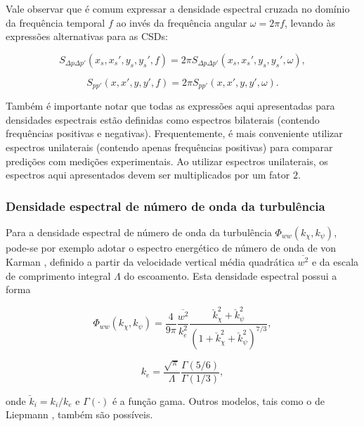 \documentclass[a4paper, 11pt, twoside]{article}
\begin{document}
Vale observar que é comum expressar a densidade espectral cruzada no domínio da frequência temporal $f$ ao invés da frequência angular $\omega = 2 \pi f$, levando às expressões alternativas para as CSDs:

\begin{equation}
	S_{\Delta p \Delta p'} (x_s, x_s', y_s, y_s', f) = 2 \pi S_{\Delta p \Delta p'} (x_s, x_s', y_s, y_s', \omega),
\end{equation}

\begin{equation}
	S_{p p'} (x, x', y, y', f) = 2 \pi S_{p p'} (x, x', y, y', \omega).
\end{equation}

Também é importante notar que todas as expressões aqui apresentadas para densidades espectrais estão definidas como espectros bilaterais (contendo frequências positivas e negativas). Frequentemente, é mais conveniente utilizar espectros unilaterais (contendo apenas frequências positivas) para comparar predições com medições experimentais. Ao utilizar espectros unilaterais, os espectros aqui apresentados devem ser multiplicados por um fator $2$.

\subsubsection{Densidade espectral de número de onda da turbulência}

Para a densidade espectral de número de onda da turbulência $\Phi_{ww}(k_\chi, k_\psi)$, pode-se por exemplo adotar o espectro energético de número de onda de von Karman \cite{Amiet75}, definido a partir da velocidade vertical média quadrática $\overline{w^2}$ e da escala de comprimento integral $\Lambda$ do escoamento. Esta densidade espectral possui a forma

\begin{equation}
	\Phi_{ww}(k_\chi, k_\psi) = \frac{4}{9 \pi} \frac{\overline{w^2}}{k_e^2} \frac{\check{k}_\chi^2 + \check{k}_\psi^2}{\left(1 + \check{k}_\chi^2 + \check{k}_\psi^2 \right)^{7/3}},
	\label{eq:vonKarmanModel}
\end{equation}

\begin{equation}
	k_e = \frac{\sqrt{\pi}}{\Lambda} \frac{\Gamma (5/6)}{\Gamma (1/3)},
\end{equation}

\noindent onde $\check{k}_i = k_i/k_e$ e $\Gamma (\cdot)$ é a função gama. Outros modelos, tais como o de Liepmann \cite{Paruchuri2017}, também são possíveis.
\end{document}
